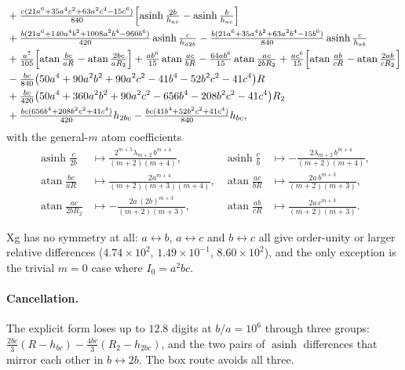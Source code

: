 \documentclass[11pt]{article}
\theoremstyle{remark}
\newcommand{\asinh}{\operatorname{asinh}}
\newcommand{\atan}{\operatorname{atan}}
\begin{document}
{\begin{align}
&+ \tfrac{c(21a^6+35a^4c^2+63a^2c^4-15c^6)}{840}\Bigl[\asinh\tfrac{2b}{h_{ac}} - \asinh\tfrac{b}{h_{ac}}\Bigr]\notag\\
&+ \tfrac{b(21a^6+140a^4b^2+1008a^2b^4-960b^6)}{420}\asinh\tfrac{c}{h_{a2b}}
 - \tfrac{b(21a^6+35a^4b^2+63a^2b^4-15b^6)}{840}\asinh\tfrac{c}{h_{ab}}\notag\\
&+ \tfrac{a^7}{105}\Bigl[\atan\tfrac{bc}{aR} - \atan\tfrac{2bc}{aR_2}\Bigr]
 + \tfrac{ab^6}{15}\atan\tfrac{ac}{bR} - \tfrac{64ab^6}{15}\atan\tfrac{ac}{2bR_2}
 + \tfrac{ac^6}{15}\Bigl[\atan\tfrac{ab}{cR} - \atan\tfrac{2ab}{cR_2}\Bigr]\notag\\
&- \tfrac{bc}{840}\bigl(50a^4+90a^2b^2+90a^2c^2-41b^4-52b^2c^2-41c^4\bigr)R\notag\\
&+ \tfrac{bc}{420}\bigl(50a^4+360a^2b^2+90a^2c^2-656b^4-208b^2c^2-41c^4\bigr)R_2\notag\\
&+ \tfrac{bc(656b^4+208b^2c^2+41c^4)}{420}h_{2bc}
 - \tfrac{bc(41b^4+52b^2c^2+41c^4)}{840}h_{bc},
\end{align}}%
with the general-$m$ atom coefficients
\begin{equation}
\boxed{\;
\begin{aligned}
\asinh\tfrac{c}{2b} &\longmapsto \frac{2^{m+5}\lambda_{m+2}\,b^{m+4}}{(m+2)(m+4)}, &
\asinh\tfrac{c}{b} &\longmapsto -\frac{2\lambda_{m+2}\,b^{m+4}}{(m+2)(m+4)}, \\
\atan\tfrac{bc}{aR} &\longmapsto \frac{2a^{m+4}}{(m+2)(m+3)(m+4)}, &
\atan\tfrac{ac}{bR} &\longmapsto \frac{2a\,b^{m+3}}{(m+2)(m+3)}, \\
\atan\tfrac{ac}{2bR_2} &\longmapsto -\frac{2a\,(2b)^{m+3}}{(m+2)(m+3)}, &
\atan\tfrac{ab}{cR} &\longmapsto \frac{2a\,c^{m+3}}{(m+2)(m+3)}.
\end{aligned}\;}
\end{equation}

Xg has no symmetry at all: $a\leftrightarrow b$, $a\leftrightarrow c$ and
$b\leftrightarrow c$ all give order-unity or larger relative differences
($4.74\times10^{2}$, $1.49\times10^{-1}$, $8.60\times10^{2}$), and the only exception is
the trivial $m = 0$ case where $I_0 = a^2bc$.

\paragraph{Cancellation.} The explicit form loses up to $12.8$ digits at $b/a = 10^{6}$
through three groups: $\tfrac{2bc}{3}(R - h_{bc}) - \tfrac{4bc}{3}(R_2 - h_{2bc})$, and
the two pairs of $\asinh$ differences that mirror each other in $b\leftrightarrow 2b$. The
box route avoids all three.
\end{document}
